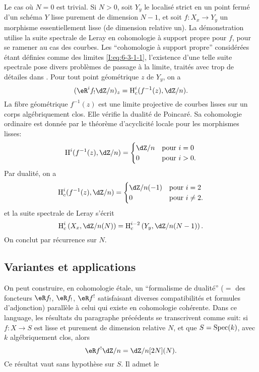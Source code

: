 Le cas où $N=0$ est trivial. Si $N>0$, soit $Y_y$ le localisé strict en un 
point fermé d'un schéma $Y$ lisse purement de dimension $N-1$, et soit 
$f:X_x\to Y_y$ un morphisme essentiellement lisse (de dimension relative un). 
La démonstration utilise la suite spectrale de Leray en cohomologie à 
support propre pour $f$, pour se ramener au cas des courbes. Les ``cohomologie 
à support propre'' considérées étant définies comme des limites 
\eqref{I:eq:6-3-1-1}, l'existence d'une telle suite spectrale pose divers 
problèmes de passage à la limite, traités avec trop de détailes dans 
\cite[XVIII]{sga4}. Pour tout point géométrique $z$ de $Y_y$, on a 
\[
  (\eR^if_! \dZ/n)_z = \h_c^i(f^{-1}(z),\dZ/n) \text{.}
\]
La fibre géométrique $f^{-1}(z)$ est une limite projective de courbes lisses 
sur un corps algébriquement clos. Elle vérifie la dualité de Poincaré. 
Sa cohomologie ordinaire est donnée par le théorème d'acyclicité locale 
pour les morphismes lisses: 
\[
  \h^i(f^{-1}(z),\dZ/n) 
    = \begin{cases}
        \dZ/n & \text{pour $i=0$} \\
        0     & \text{pour $i>0$.}
      \end{cases}
\]
Par dualité, on a 
\[
  \h_c^i(f^{-1}(z),\dZ/n) 
    = \begin{cases}
        \dZ/n(-1) & \text{pour $i=2$} \\
        0         & \text{pour $i\ne 2$.}
      \end{cases}
\]
et la suite spectrale de Leray s'écrit 
\[
  \h_c^i\left(X_x,\dZ/n(N)\right) = \h_c^{i-2}\left(Y_y,\dZ/n(N-1)\right) \text{.}
\]
On conclut par récurrence sur $N$. 










\subsection{Variantes et applications}\label{I:6-4}

On peut construire, en cohomologie étale, un ``formalisme de dualité'' 
($=$ des foncteurs $\eR f_!$, $\eR f_!$, $\eR f^!$ satisfaisant diverses 
compatibilités et formules d'adjonction) parallèle à celui qui existe en 
cohomologie cohérente. Dans ce language, les résultats du paragraphe 
précédents se transcrivent comme suit: si $f:X\to S$ est lisse et purement 
de dimension relative $N$, et que $S=\operatorname{Spec}(k)$, avec $k$ algébriquement clos, 
alors 
\[
  \eR f^! \dZ/n = \dZ/n [2N](N) \text{.}
\]
Ce résultat vaut sans hypothèse sur $S$. Il admet le 





